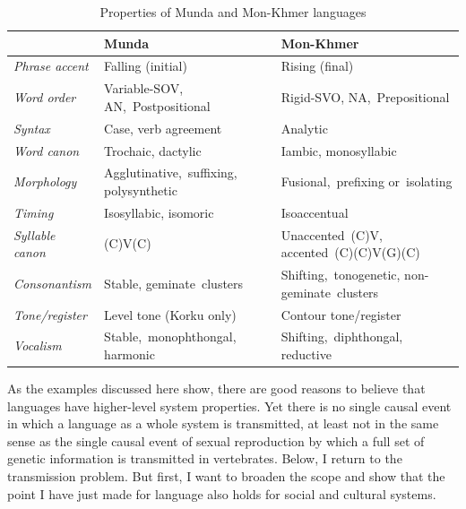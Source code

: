 \begin{table}[h]
\begin{tabularx}{\textwidth}{>{\it}XXX}
 & \textbf{Munda} & \textbf{Mon-Khmer} \\
\hline
Phrase accent & Falling (initial)                & Rising (final) \\[.3em]
Word order    & Variable-SOV, 
                \mbox{AN, Postpositional}        & Rigid-SVO, 
               \mbox{NA, Prepositional} \\[.3em]
Syntax        & Case, verb agreement             & Analytic \\[.3em]
Word canon    & Trochaic, dactylic               & Iambic, monosyllabic \\[.3em]
Morphology    & \mbox{Agglutinative, suffixing,} 
                 polysynthetic                   & \mbox{Fusional, prefixing} 
\mbox{or isolating} \\[.3em]
Timing        & Isosyllabic, isomoric           & Isoaccentual \\[.3em]
Syllable canon& (C)V(C)                         & \mbox{Unaccented (C)V,} 
       \mbox{accented (C)(C)V(G)(C)} \\[.3em]
Consonantism  & Stable, 
               \mbox{geminate clusters}         & \mbox{Shifting, tonogenetic,} 
       \mbox{non-geminate clusters} \\[.3em]
Tone/register & Level tone (Korku only)         & Contour tone/register \\[.3em]
Vocalism      & \mbox{Stable, monophthongal,}
       \mbox{harmonic}                & \mbox{Shifting, diphthongal,} 
\mbox{reductive} \\[.3em]
\hline
\end{tabularx}
\caption{Properties of Munda and Mon-Khmer languages}
\label{mundamonkhmer}
\end{table} 



As the examples discussed here show, there are good reasons to believe 
that languages have higher-level system properties. Yet there is no 
single causal event in which a language as a whole system is transmitted, at least not in the same sense as the single causal event of sexual reproduction by which a full set 
of genetic information is transmitted in vertebrates. Below, I return to the 
transmission problem. But first, I want to broaden the scope and show that 
the point I have just made for language also holds for social and 
cultural systems. 



